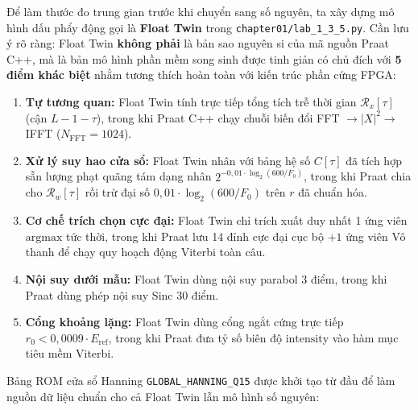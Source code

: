 \documentclass[11pt,a4paper]{article}
\begin{document}
Để làm thước đo trung gian trước khi chuyển sang số nguyên, ta xây dựng mô hình dấu phẩy động gọi là \textbf{Float Twin} trong \texttt{chapter01/lab\_1\_3\_5.py}. Cần lưu ý rõ ràng: Float Twin \textbf{không phải} là bản sao nguyên si của mã nguồn Praat C++, mà là bản mô hình phần mềm song sinh được tinh giản có chủ đích với \textbf{5 điểm khác biệt} nhằm tương thích hoàn toàn với kiến trúc phần cứng FPGA:
\begin{enumerate}
    \setlength{\itemsep}{0.5pt}
    \item \textbf{Tự tương quan:} Float Twin tính trực tiếp tổng tích trễ thời gian $\mathcal{R}_x[\tau]$ (cận $L - 1 - \tau$), trong khi Praat C++ chạy chuỗi biến đổi FFT $\to |X|^2 \to$ IFFT ($N_{\text{FFT}} = 1024$).
    \item \textbf{Xử lý suy hao cửa sổ:} Float Twin nhân với bảng hệ số $C[\tau]$ đã tích hợp sẵn lượng phạt quãng tám dạng nhân $2^{-0{,}01 \cdot \log_2(600/F_0)}$, trong khi Praat chia cho $\mathcal{R}_w[\tau]$ rồi trừ đại số $0{,}01 \cdot \log_2(600/F_0)$ trên $r$ đã chuẩn hóa.
    \item \textbf{Cơ chế trích chọn cực đại:} Float Twin chỉ trích xuất duy nhất 1 ứng viên $\text{argmax}$ tức thời, trong khi Praat lưu 14 đỉnh cực đại cục bộ $+ 1$ ứng viên Vô thanh để chạy quy hoạch động Viterbi toàn câu.
    \item \textbf{Nội suy dưới mẫu:} Float Twin dùng nội suy parabol 3 điểm, trong khi Praat dùng phép nội suy Sinc 30 điểm.
    \item \textbf{Cổng khoảng lặng:} Float Twin dùng cổng ngắt cứng trực tiếp $r_0 < 0{,}0009 \cdot E_{\text{ref}}$, trong khi Praat đưa tỷ số biên độ $\text{intensity}$ vào hàm mục tiêu mềm Viterbi.
\end{enumerate}

Bảng ROM cửa sổ Hanning \texttt{GLOBAL\_HANNING\_Q15} được khởi tạo từ đầu để làm nguồn dữ liệu chuẩn cho cả Float Twin lẫn mô hình số nguyên:
\end{document}
